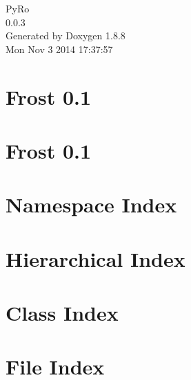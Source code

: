 \documentclass[twoside]{book}
\newcommand{\+}{\discretionary{\mbox{\scriptsize$\hookleftarrow$}}{}{}}
\newcommand{\clearemptydoublepage}{%
  \newpage{\pagestyle{empty}\cleardoublepage}%
}
\begin{document}
\hypersetup{pageanchor=false,
             bookmarks=true,
             bookmarksnumbered=true,
             pdfencoding=unicode
            }
\begin{titlepage}
\vspace*{7cm}
\begin{center}%
{\Large Py\+Ro \\[1ex]\large 0.\+0.\+3 }\\
\vspace*{1cm}
{\large Generated by Doxygen 1.8.8}\\
\vspace*{0.5cm}
{\small Mon Nov 3 2014 17:37:57}\\
\end{center}
\end{titlepage}
\clearemptydoublepage
\tableofcontents
\clearemptydoublepage
{}
\hypersetup{pageanchor=true}

\chapter{Frost 0.1}
\label{md_GIT-COPY_Software_README}
\hypertarget{md_GIT-COPY_Software_README}{}

\chapter{Frost 0.1}
\label{md_README}
\hypertarget{md_README}{}

\chapter{Namespace Index}

\chapter{Hierarchical Index}

\chapter{Class Index}

\chapter{File Index}

\end{document}
